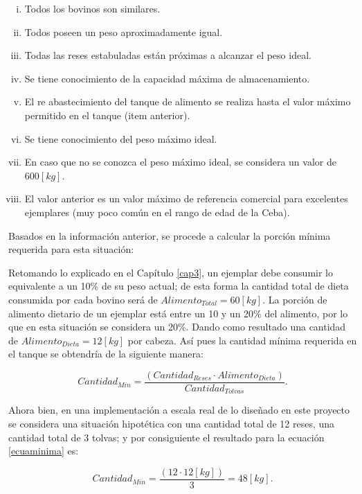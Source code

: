 \begin{enumerate}[(i)]
    \item Todos los bovinos son similares.
    \item Todos poseen un peso aproximadamente igual.
    \item Todas las reses estabuladas están próximas a alcanzar el peso ideal.
    \item Se tiene conocimiento de la capacidad máxima de almacenamiento.
    \item El re abastecimiento del tanque de alimento se realiza hasta el valor máximo permitido en el tanque (item anterior).
    \item Se tiene conocimiento del peso máximo ideal.
    \item En caso que no se conozca el peso máximo ideal, se considera un valor de $600[kg]$.
    \item El valor anterior es un valor máximo  de referencia comercial para excelentes ejemplares (muy poco común en el rango de edad de la Ceba).
\end{enumerate}

Basados en la información anterior, se procede a calcular la porción mínima requerida para esta situación:

    Retomando lo explicado en el Capítulo \ref{cap3}, un ejemplar debe consumir lo equivalente a un 10\% de su peso actual; de esta forma la cantidad total de dieta consumida por cada bovino será de $Alimento_{Total} = 60[kg]$.
    La porción de alimento dietario de un ejemplar está entre un 10 y un 20\% del alimento, por lo que en esta situación se considera un 20\%. Dando como resultado una cantidad de $Alimento_{Dieta} = 12[kg]$ por cabeza.
    Así pues la cantidad mínima requerida en el tanque se obtendría de la siguiente manera:

    \begin{equation}
        Cantidad_{Min} = \frac{\left(Cantidad_{Reses}\cdot Alimento_{Dieta}\right)}{Cantidad_{Tolvas}}. \label{ecuaminima}
    \end{equation}

Ahora bien, en una implementación a escala real de lo diseñado en este proyecto se considera una situación hipotética con una cantidad total de 12 reses, una cantidad total de 3 tolvas; y por consiguiente el resultado para la ecuación \ref{ecuaminima} es:  

    \begin{equation}
        Cantidad_{Min} = \frac{\left(12\cdot 12[kg]\right)}{3} = 48[kg]. \label{ecuaminima2}
    \end{equation}

